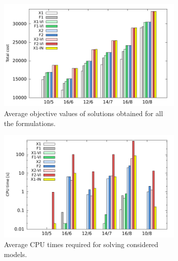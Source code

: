 \begin{figure}[!htb]
    \centering
    \begin{subfigure}[b]{0.98\textwidth}
        \includegraphics[width=\textwidth]{cost}
        \caption{Average objective values of solutions obtained for all the formulations.}
        \label{fig:costcomp}
    \end{subfigure}
    \hfill %
      
    \begin{subfigure}[b]{0.98\textwidth}
        \includegraphics[width=\textwidth]{time}
        \caption{Average CPU times required for solving considered models. %
        }
        \label{fig:timecomp}
    \end{subfigure}
    \caption{} \label{fig:BProof}
\end{figure}   
